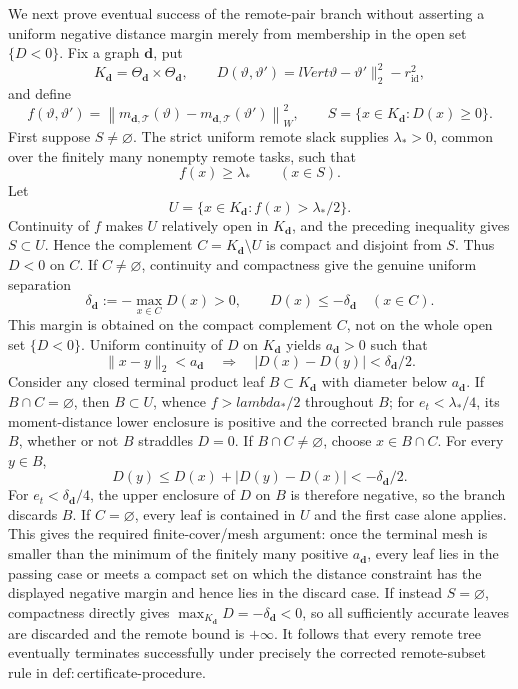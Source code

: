 We next prove eventual success of the remote-pair branch without asserting a uniform negative distance margin merely from membership in the open set \(\{D<0\}\).  Fix a graph \(\boldsymbol d\), put
\[
 K_{\boldsymbol d}=\Theta_{\boldsymbol d}\times\Theta_{\boldsymbol d},
 \qquad
 D(\vartheta,\vartheta')=lVert\vartheta-\vartheta'\rVert_2^2-r_{\mathrm{id}}^2,
\]
and define
\[
 f(\vartheta,\vartheta')=
 \left\lVert m_{\boldsymbol d,\mathcal T}(\vartheta)
              -m_{\boldsymbol d,\mathcal T}(\vartheta')\right\rVert_W^2,
 \qquad
 S=\{x\in K_{\boldsymbol d}:D(x)\geq0\}.
\]
First suppose \(S\neq\varnothing\).  The strict uniform remote slack supplies \(\lambda_*>0\), common over the finitely many nonempty remote tasks, such that
\[
 f(x)\geq\lambda_*\qquad(x\in S).
\]
Let
\[
 U=\{x\in K_{\boldsymbol d}:f(x)>\lambda_*/2\}.
\]
Continuity of \(f\) makes \(U\) relatively open in \(K_{\boldsymbol d}\), and the preceding inequality gives \(S\subset U\).  Hence the complement \(C=K_{\boldsymbol d}\setminus U\) is compact and disjoint from \(S\).  Thus \(D<0\) on \(C\).  If \(C\neq\varnothing\), continuity and compactness give the genuine uniform separation
\[
 \delta_{\boldsymbol d}:=-\max_{x\in C}D(x)>0,
 \qquad D(x)\leq-\delta_{\boldsymbol d}\quad(x\in C).
\]
This margin is obtained on the compact complement \(C\), not on the whole open set \(\{D<0\}\).  Uniform continuity of \(D\) on \(K_{\boldsymbol d}\) yields \(a_{\boldsymbol d}>0\) such that
\[
 \lVert x-y\rVert_2<a_{\boldsymbol d}
 \quad\Longrightarrow\quad
 |D(x)-D(y)|<\delta_{\boldsymbol d}/2.
\]
Consider any closed terminal product leaf \(B\subset K_{\boldsymbol d}\) with diameter below \(a_{\boldsymbol d}\).  If \(B\cap C=\varnothing\), then \(B\subset U\), whence \(f>lambda_*/2\) throughout \(B\); for \(e_t<\lambda_*/4\), its moment-distance lower enclosure is positive and the corrected branch rule passes \(B\), whether or not \(B\) straddles \(D=0\).  If \(B\cap C\neq\varnothing\), choose \(x\in B\cap C\).  For every \(y\in B\),
\[
 D(y)\leq D(x)+|D(y)-D(x)|
 <-\delta_{\boldsymbol d}/2.
\]
For \(e_t<\delta_{\boldsymbol d}/4\), the upper enclosure of \(D\) on \(B\) is therefore negative, so the branch discards \(B\).  If \(C=\varnothing\), every leaf is contained in \(U\) and the first case alone applies.  This gives the required finite-cover/mesh argument: once the terminal mesh is smaller than the minimum of the finitely many positive \(a_{\boldsymbol d}\), every leaf lies in the passing case or meets a compact set on which the distance constraint has the displayed negative margin and hence lies in the discard case.  If instead \(S=\varnothing\), compactness directly gives \(\max_{K_{\boldsymbol d}}D=-\delta_{\boldsymbol d}<0\), so all sufficiently accurate leaves are discarded and the remote bound is \(+\infty\).  It follows that every remote tree eventually terminates successfully under precisely the corrected remote-subset rule in \(\mathrm{def{:}certificate\text{-}procedure}\).

